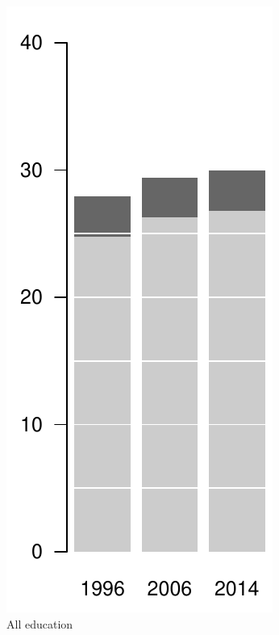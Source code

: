 \begin{figure}[ht!]
    \centering
    \begin{subfigure}[b]{0.2\textwidth}
        \includegraphics[scale=.5]{Figures/bar_male_all.pdf}
        \caption{All education}
        \label{fig:barsmalesa}
    \end{subfigure}
    ~ %
    \begin{subfigure}[b]{0.2\textwidth}

\end{subfigure}
\end{figure}
